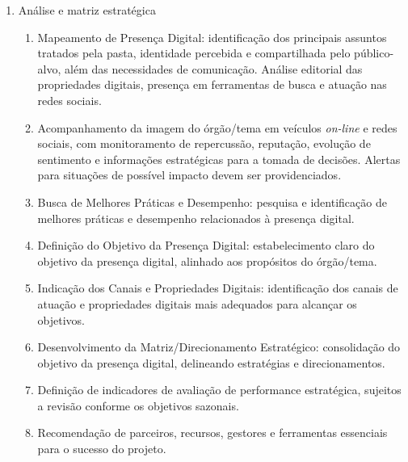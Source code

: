 \documentclass[oneside,a4paper,article]{memoir}
\begin{document}
\begin{enumerate}
\begin{enumerate}
			Desenvolvimento de um planejamento estratégico para a presença digital conforme o objeto solicitado. A partir da análise e principais pontos do mapeamento, fornecimento de recomendações de ações para cada propriedade digital e gestão da marca, boas práticas, posicionamento e sugestões de iniciativas relacionadas ao órgão/tema. Recomendação de formas de atuação e adequação para melhorias das referidas propriedades digitais. Determinação de campanhas regulares, incluindo site (SEO), e-mail marketing, impulsionamento de posts e iniciativas de conteúdo para manter a marca visível e atrativa.

			\item
	      	Análise e matriz estratégica
				\begin{enumerate}
					\item
	      			Mapeamento de Presença Digital: identificação dos principais assuntos tratados pela pasta, identidade percebida e compartilhada pelo público-alvo, além das necessidades de comunicação. Análise editorial das propriedades digitais, presença em ferramentas de busca e atuação nas redes sociais.
					\item
	      			Acompanhamento da imagem do órgão/tema em veículos  \textit{on-line} e redes sociais, com monitoramento de repercussão, reputação, evolução de sentimento e informações estratégicas para a tomada de decisões. Alertas para situações de possível impacto devem ser providenciados.
					\item
	      			Busca de Melhores Práticas e Desempenho: pesquisa e identificação de melhores práticas e desempenho relacionados à presença digital.
					\item
	      			Definição do Objetivo da Presença Digital: estabelecimento claro do objetivo da presença digital, alinhado aos propósitos do órgão/tema.
					\item
	      			Indicação dos Canais e Propriedades Digitais: identificação dos canais de atuação e propriedades digitais mais adequados para alcançar os objetivos.
					\item
	      			Desenvolvimento da Matriz/Direcionamento Estratégico: consolidação do objetivo da presença digital, delineando estratégias e direcionamentos.
					\item
	      			Definição de indicadores de avaliação de performance estratégica, sujeitos a revisão conforme os objetivos sazonais.
					\item
					Recomendação de parceiros, recursos, gestores e ferramentas essenciais para o sucesso do projeto.

\end{enumerate}
\end{enumerate}
\end{enumerate}
\end{document}
